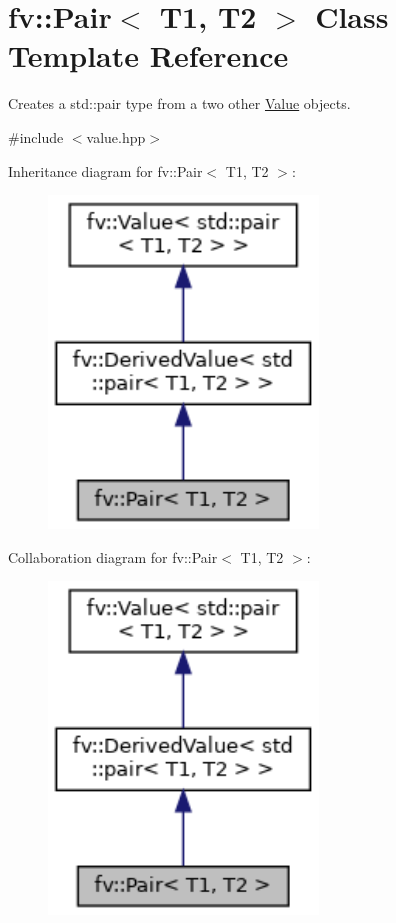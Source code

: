 \hypertarget{classfv_1_1Pair}{}\section{fv\+:\+:Pair$<$ T1, T2 $>$ Class Template Reference}
\label{classfv_1_1Pair}


Creates a std\+::pair type from a two other \hyperlink{classfv_1_1Value}{Value} objects.  




{\ttfamily \#include $<$value.\+hpp$>$}



Inheritance diagram for fv\+:\+:Pair$<$ T1, T2 $>$\+:
\nopagebreak
\begin{figure}[H]
\begin{center}
\leavevmode
\includegraphics[width=203pt]{classfv_1_1Pair__inherit__graph}
\end{center}
\end{figure}


Collaboration diagram for fv\+:\+:Pair$<$ T1, T2 $>$\+:
\nopagebreak
\begin{figure}[H]
\begin{center}
\leavevmode
\includegraphics[width=203pt]{classfv_1_1Pair__coll__graph}
\end{center}
\end{figure}
